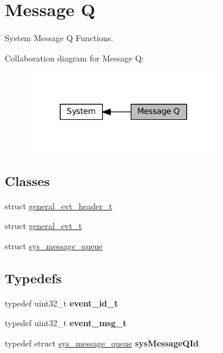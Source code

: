 \hypertarget{group__SYSTEM__MESSAGE__Q}{}\section{Message Q}
\label{group__SYSTEM__MESSAGE__Q}


System Message Q Functions.  


Collaboration diagram for Message Q\+:\nopagebreak
\begin{figure}[H]
\begin{center}
\leavevmode
\includegraphics[width=239pt]{group__SYSTEM__MESSAGE__Q}
\end{center}
\end{figure}
\subsection*{Classes}
\begin{DoxyCompactItemize}
\item 
struct \hyperlink{structgeneral__evt__header__t}{general\+\_\+evt\+\_\+header\+\_\+t}
\item 
struct \hyperlink{structgeneral__evt__t}{general\+\_\+evt\+\_\+t}
\item 
struct \hyperlink{structsys__message__queue}{sys\+\_\+message\+\_\+queue}
\end{DoxyCompactItemize}
\subsection*{Typedefs}
\begin{DoxyCompactItemize}
\item 
\mbox{\label{group__SYSTEM__MESSAGE__Q_gad24a094c35ed8ae444f4b7c6ea51704d}} 
typedef uint32\+\_\+t {\bfseries event\+\_\+id\+\_\+t}
\item 
\mbox{\label{group__SYSTEM__MESSAGE__Q_ga655cadf65449a0b80f198cb7ce166d41}} 
typedef uint32\+\_\+t {\bfseries event\+\_\+msg\+\_\+t}
\item 
\mbox{\label{group__SYSTEM__MESSAGE__Q_ga4d5c8f4d684de3a1e6e73e63f9f25c98}} 
typedef struct \hyperlink{structsys__message__queue}{sys\+\_\+message\+\_\+queue} {\bfseries sys\+Message\+Q\+Id}
\end{DoxyCompactItemize}
